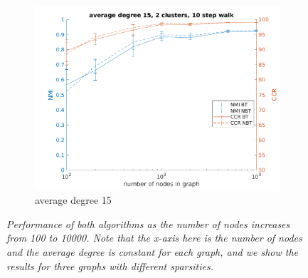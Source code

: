 \documentclass{article} %
\begin{document}
\begin{figure}[H]
\begin{subfigure}{0.33\textwidth}
        \includegraphics[width=\linewidth]{fig2/C15K2len10}
        \caption{average degree 15}
        \label{fig:subim23}
    \end{subfigure}
    \caption{\emph{Performance of both algorithms as the number of nodes increases from 100 to 10000. Note that the x-axis here is the number of nodes and the average degree is constant for each graph, and we show the results for three graphs with different sparsities.}}
    \label{fig:image2}
\end{figure}
\end{document}
